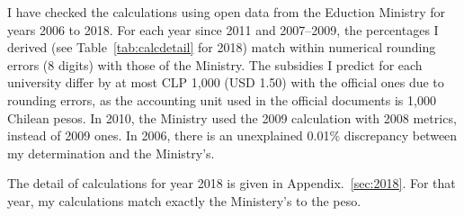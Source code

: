 \documentclass[twocolumn]{article}
\begin{document}
I have checked the calculations using open data from the Eduction Ministry for
years 2006 to 2018. For each year since 2011 and 2007--2009, the percentages I
derived (see Table~\ref{tab:calcdetail} for 2018) match within numerical
rounding errors (8 digits) with those of the Ministry. The subsidies I predict
for each university differ by at most CLP 1,000 (USD 1.50) with the
official ones due to rounding errors, as the accounting unit used in the
official documents is 1,000 Chilean pesos. In 2010, the Ministry used the 2009
calculation with 2008 metrics, instead of 2009 ones. In 2006, there is an
unexplained 0.01\% discrepancy between my determination and the Ministry's. 

The detail of calculations for year 2018 is given in Appendix.~\ref{sec:2018}.
For that year, my calculations match exactly the Ministery's to the peso.
\end{document}
